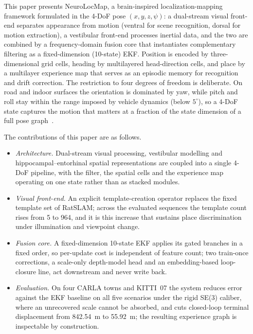 \documentclass[review,12pt]{elsarticle}
\begin{document}
This paper presents NeuroLocMap, a brain-inspired localization-mapping framework formulated in the 4-DoF pose $(x,y,z,\psi)$: a dual-stream visual front-end separates appearance from motion (ventral for scene recognition, dorsal for motion extraction), a vestibular front-end processes inertial data, and the two are combined by a frequency-domain fusion core that instantiates complementary filtering as a fixed-dimension (10-state) EKF. Position is encoded by three-dimensional grid cells, heading by multilayered head-direction cells, and place by a multilayer experience map that serves as an episodic memory for recognition and drift correction. The restriction to four degrees of freedom is deliberate. On road and indoor surfaces the orientation is dominated by yaw, while pitch and roll stay within the range imposed by vehicle dynamics (below $5^\circ$), so a 4-DoF state captures the motion that matters at a fraction of the state dimension of a full pose graph~\cite{milford2004ratslam,milford2010persistent}.

The contributions of this paper are as follows.
\begin{itemize}
    \item \emph{Architecture.} Dual-stream visual processing, vestibular modelling and hippocampal--entorhinal spatial representations are coupled into a single 4-DoF pipeline, with the filter, the spatial cells and the experience map operating on one state rather than as stacked modules.
    \item \emph{Visual front-end.} An explicit template-creation operator replaces the fixed template set of RatSLAM; across the evaluated sequences the template count rises from 5 to 964, and it is this increase that sustains place discrimination under illumination and viewpoint change.
    \item \emph{Fusion core.} A fixed-dimension 10-state EKF applies its gated branches in a fixed order, so per-update cost is independent of feature count; two train-once corrections, a scale-only depth-model head and an embedding-based loop-closure line, act downstream and never write back.
    \item \emph{Evaluation.} On four CARLA towns and KITTI~07 the system reduces error against the EKF baseline on all five scenarios under the rigid SE(3) caliber, where an unrecovered scale cannot be absorbed, and cuts closed-loop terminal displacement from 842.54~m to 55.92~m; the resulting experience graph is inspectable by construction.
\end{itemize}
\end{document}
